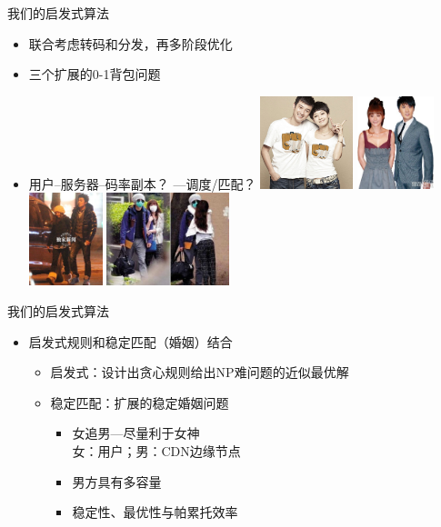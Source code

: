 \documentclass{beamer}
\begin{document}
\begin{frame}{我们的启发式算法}
\begin{itemize}
\item 联合考虑转码和分发，再多阶段优化
\item 三个扩展的0-1背包问题
\item 用户--服务器--码率副本？ ---调度/匹配？\pause
\includegraphics[height=2.7cm]{fig/wenzhang_mayili.jpg}\pause
\includegraphics[height=2.7cm]{fig/yaodi_chishuai1.jpg}\pause
\includegraphics[height=2.7cm]{fig/yaodi_chishuai.jpg}\pause
\includegraphics[height=2.7cm]{fig/wenzhang_yaodi.jpg}
\end{itemize}
\end{frame}
\begin{frame}{我们的启发式算法}
\begin{itemize}
\item 启发式规则和稳定匹配（婚姻）结合
	\begin{itemize}
		\item 启发式：设计出贪心规则给出NP难问题的近似最优解
		\item 稳定匹配：扩展的稳定婚姻问题\\
			\begin{itemize}
					\item 女追男---尽量利于女神\\
						女：用户；男：CDN边缘节点
					\item 男方具有多容量
					\item 稳定性、最优性与帕累托效率
			\end{itemize}
	\end{itemize}
\end{itemize}
\end{frame}
\end{document}
